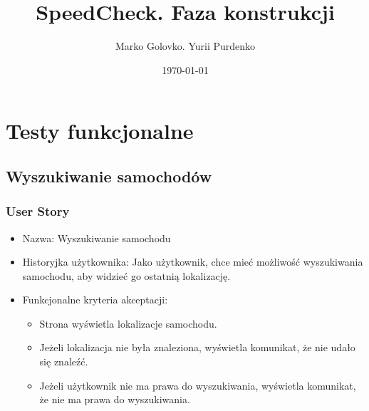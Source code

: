 \documentclass[12pt]{article}
\title{SpeedCheck. Faza konstrukcji}
\author{Marko Golovko. Yurii Purdenko}
\date{\today}
\begin{document}
\begin{titlepage}
\maketitle
\end{titlepage}

\renewcommand{\vhhistoryname}{Historia zmian}
\newcommand{\MG}{Marko Golovko}
\begin{versionhistory}
  \renewcommand{\vhhistoryname}{Histria zmian}
  \renewcommand{\vhversionname}{Numer wersji}  
  \renewcommand{\vhdatename}{Data} 
  \renewcommand{\vhauthorname}{Autor} 
  \renewcommand{\vhchangename}{Opis}
 \end{versionhistory}

\tableofcontents

\section{Testy funkcjonalne}

\subsection{Wyszukiwanie samochodów}

\subsubsection{User Story}
\begin{itemize}
\item Nazwa: Wyszukiwanie samochodu
\item Historyjka użytkownika: Jako użytkownik, chce mieć możliwość wyszukiwania samochodu, aby widzieć go ostatnią lokalizację.
\item Funkcjonalne kryteria akceptacji: 
	\begin{itemize}
	\item Strona wyświetla lokalizacje samochodu.
	\item Jeżeli lokalizacja nie była znaleziona, wyświetla komunikat, że nie udało się znaleźć.
	\item Jeżeli użytkownik nie ma prawa do wyszukiwania,  wyświetla komunikat, że nie ma prawa do wyszukiwania.
	\end{itemize}
\end{itemize}
\end{document}
